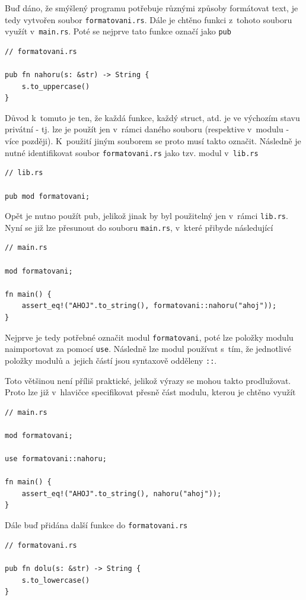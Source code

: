 \documentclass[a4paper, 12pt]{article} %
\newcommand{\rust}[1]{\texttt{#1}}
\begin{document}
        Buď dáno, že smýšlený programu potřebuje různými způsoby formátovat text, je tedy vytvořen soubor \texttt{formatovani.rs}. Dále je chtěno funkci z~tohoto souboru využít v~\texttt{main.rs}. Poté se nejprve tato funkce označí jako \rust{pub}
        \begin{verbatim}
// formatovani.rs

pub fn nahoru(s: &str) -> String {
    s.to_uppercase()
}
        \end{verbatim}

        Důvod k~tomuto je ten, že každá funkce, každý struct, atd. je ve výchozím stavu privátní - tj. lze je použít jen v~rámci daného souboru (respektive v~modulu - více později). K~použití jiným souborem se proto musí takto označit. Následně je nutné identifikovat soubor \texttt{formatovani.rs} jako tzv. modul v~\texttt{lib.rs}
        \begin{verbatim}
// lib.rs

pub mod formatovani;
        \end{verbatim}
        
        Opět je nutno použít pub, jelikož jinak by byl použitelný jen v~rámci \texttt{lib.rs}. Nyní se již lze přesunout do souboru \texttt{main.rs}, v~které přibyde následující
        \begin{verbatim}
// main.rs

mod formatovani;

fn main() {
    assert_eq!("AHOJ".to_string(), formatovani::nahoru("ahoj"));    
}
        \end{verbatim}
        
        Nejprve je tedy potřebné označit modul \rust{formatovani}, poté lze položky modulu naimportovat za pomocí \rust{use}. Následně lze modul používat s~tím, že jednotlivé položky modulů a~jejich částí jsou syntaxově odděleny \rust{::}.
        
        Toto většinou není příliš praktické, jelikož výrazy se mohou takto prodlužovat. Proto lze již v~hlavičce specifikovat přesně část modulu, kterou je chtěno využít
        \begin{verbatim}
// main.rs

mod formatovani;

use formatovani::nahoru;

fn main() {
    assert_eq!("AHOJ".to_string(), nahoru("ahoj"));
}
        \end{verbatim}
        
        Dále buď přidána další funkce do \texttt{formatovani.rs}
        \begin{verbatim}
// formatovani.rs

pub fn dolu(s: &str) -> String {
    s.to_lowercase()
}
        \end{verbatim}
        
\end{document}
